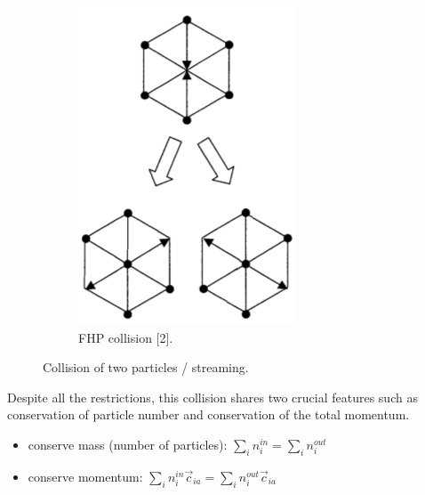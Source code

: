 \begin{figure}[H]
\begin{subfigure}[h]{0.3\textwidth}
    \includegraphics[width=\textwidth]{img/fig5.png}
    \caption{FHP collision [2].}
  \end{subfigure}
  \caption{Collision of two particles / streaming.}
\end{figure}

Despite all the restrictions, this collision shares two crucial features such as conservation of particle number and conservation of the total momentum.

\begin{itemize}
\item conserve mass (number of particles): $ \sum_i n_i^{in} = \sum_i n_i^{out} $
\item conserve momentum: $ \sum_i n_i^{in} \vec{c}_{ia} = \sum_i n_i^{out} \vec{c}_{ia} $
\end{itemize}

